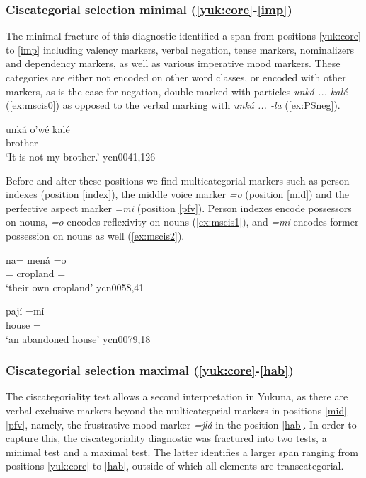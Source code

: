 \documentclass[output=paper]{langscibook}
\begin{document}
\subsubsection{Ciscategorial selection minimal (\ref{yuk:core}-\ref{imp})}
The minimal fracture of this diagnostic identified a span from positions \ref{yuk:core} to \ref{imp} including valency markers, verbal negation, tense markers, nominalizers and dependency markers, as well as various imperative mood markers. These categories are either not encoded on other word classes, or encoded with other markers, as is the case for negation, double-marked with particles \textit{unká ... kalé} (\ref{ex:mscis0}) as opposed to the verbal marking with \textit{unká ... -la} (\ref{ex:PSneg}).

\ea \label{ex:mscis0}
    \gll unká o'wé kalé  \\
          \Neg{} brother \Nvneg{}       \\
    \glt `It is not my brother.' \hfill ycn0041,126
 \z
 
Before and after these positions we find multicategorial markers such as person indexes (position \ref{index}), the middle voice marker \textit{=o} (position \ref{mid}) and the perfective aspect marker \textit{=mi} (position \ref{pfv}). Person indexes encode possessors on nouns, \textit{=o} encodes reflexivity on nouns (\ref{ex:mscis1}), and \textit{=mi} encodes former possession on nouns as well (\ref{ex:mscis2}). 

\ea \label{ex:mscis1}
    \gll na= mená =o  \\
          \Tpl{}= cropland =\Mid{} \\
    \glt `their own cropland' \hfill ycn0058,41
 \z
 
\ea \label{ex:mscis2}
    \gll pají =mí  \\
          house =\Pfv{}\\
    \glt `an abandoned house' \hfill ycn0079,18
 \z

\subsubsection{Ciscategorial selection maximal (\ref{yuk:core}-\ref{hab})}
The ciscategoriality test allows a second interpretation in Yukuna, as there are verbal-exclusive markers beyond the multicategorial markers in positions \ref{mid}-\ref{pfv}, namely, the frustrative mood marker \textit{=jlá} in the position \ref{hab}. In order to capture this, the ciscategoriality diagnostic was fractured into two tests, a minimal test and a maximal test. The latter identifies a larger span ranging from positions \ref{yuk:core} to \ref{hab}, outside of which all elements are transcategorial.
\end{document}
